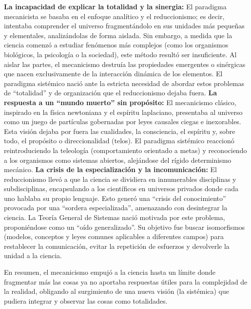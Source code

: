 \documentclass[12pt,a4paper]{article}
\begin{document}
\begin{enumerate}[label=\textbf{Pregunta \arabic*.}]
          \textbf{La incapacidad de explicar la totalidad y la sinergia:} El paradigma mecanicista se basaba en el enfoque analítico y el reduccionismo; es decir, intentaba comprender el universo fragmentándolo en sus unidades más pequeñas y elementales, analizándolas de forma aislada. Sin embargo, a medida que la ciencia comenzó a estudiar fenómenos más complejos (como los organismos biológicos, la psicología o la sociedad), este método resultó ser insuficiente. Al aislar las partes, el mecanicismo destruía las propiedades emergentes o sinérgicas que nacen exclusivamente de la interacción dinámica de los elementos. El paradigma sistémico nació ante la estricta necesidad de abordar estos problemas de ``totalidad'' y de organización que el reduccionismo dejaba fuera.
          \textbf{La respuesta a un ``mundo muerto'' sin propósito:} El mecanicismo clásico, inspirado en la física newtoniana y el espíritu laplaciano, presentaba al universo como un juego de partículas gobernadas por leyes causales ciegas e inexorables. Esta visión dejaba por fuera las cualidades, la consciencia, el espíritu y, sobre todo, el propósito o direccionalidad (telos). El paradigma sistémico reaccionó reintroduciendo la teleología (comportamiento orientado a metas) y reconociendo a los organismos como sistemas abiertos, alejándose del rígido determinismo mecánico.
          \textbf{La crisis de la especialización y la incomunicación:} El reduccionismo llevó a que la ciencia se dividiera en innumerables disciplinas y subdisciplinas, encapsulando a los científicos en universos privados donde cada uno hablaba su propio lenguaje. Esto generó una ``crisis del conocimiento'' provocada por una ``sordera especializada'', amenazando con desintegrar la ciencia. La Teoría General de Sistemas nació motivada por este problema, proponiéndose como un ``oído generalizado''. Su objetivo fue buscar isomorfismos (modelos, conceptos y leyes comunes aplicables a diferentes campos) para restablecer la comunicación, evitar la repetición de esfuerzos y devolverle la unidad a la ciencia.

          En resumen, el mecanicismo empujó a la ciencia hasta un límite donde fragmentar más las cosas ya no aportaba respuestas útiles para la complejidad de la realidad, obligando al surgimiento de una nueva visión (la sistémica) que pudiera integrar y observar las cosas como totalidades.

\end{enumerate}
\end{document}
